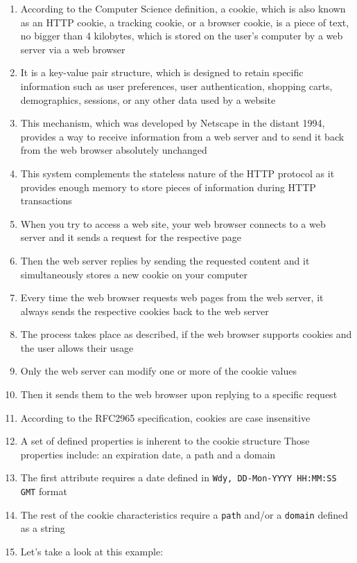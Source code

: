 \begin{enumerate}
\item 
According to the Computer Science definition, a cookie, which is also known as an HTTP cookie, a tracking cookie, or a browser cookie, is a piece of text, no bigger than 4 kilobytes, which is stored on the user’s computer by a web server via a web browser
\item  It is a key-value pair structure, which is designed to retain specific information such as user preferences, user authentication, shopping carts, demographics, sessions, or any other data used by a website
\item  This mechanism, which was developed by Netscape in the distant 1994, provides a way to receive information from a web server and to send it back from the web browser absolutely unchanged
\item  This system complements the stateless nature of the HTTP protocol as it provides enough memory to store pieces of information during HTTP transactions

\item 
When you try to access a web site, your web browser connects to a web server and it sends a request for the respective page
\item  Then the web server replies by sending the requested content and it simultaneously stores a new cookie on your computer
\item  Every time the web browser requests web pages from the web server, it always sends the respective cookies back to the web server
\item  The process takes place as described, if the web browser supports cookies and the user allows their usage
\item  Only the web server can modify one or more of the cookie values
\item  Then it sends them to the web browser upon replying to a specific request

\item According to the RFC2965 specification, cookies are case insensitive
\item  A set of defined properties is inherent to the cookie structure  Those properties include:
 an expiration date, a path and a domain
\item  The first attribute requires a date defined in \verb|Wdy, DD-Mon-YYYY HH:MM:SS GMT| format
\item  The rest of the cookie characteristics require a \verb|path| and/or a \verb|domain| defined as a string
\item  Let’s take a look at this example:


\end{enumerate}
